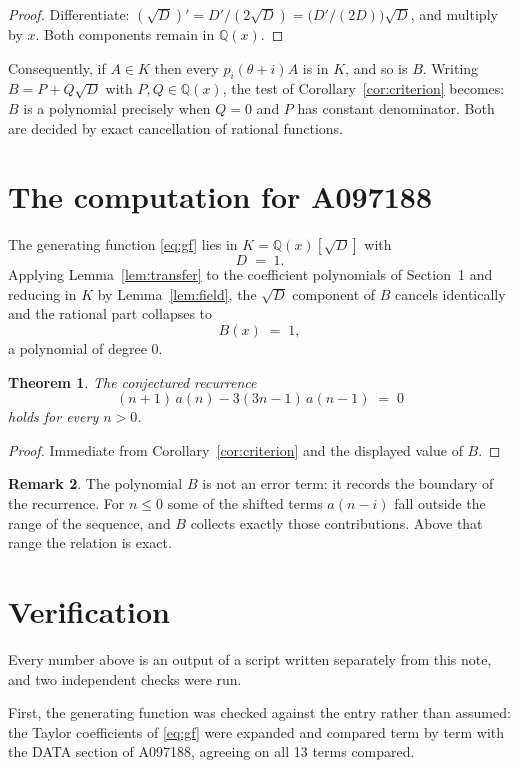 \documentclass[11pt,a4paper]{article}
\theoremstyle{plain}
\newtheorem{theorem}{Theorem}
\theoremstyle{definition}
\newtheorem{remark}[theorem]{Remark}
\begin{document}
\begin{proof}
Differentiate: $(\sqrt{D})'=D'/(2\sqrt{D})=\bigl(D'/(2D)\bigr)\sqrt{D}$, and multiply by
$x$. Both components remain in $\mathbb{Q}(x)$.
\end{proof}

Consequently, if $A\in K$ then every $p_{i}(\theta+i)A$ is in $K$, and so is $B$. Writing
$B=P+Q\sqrt{D}$ with $P,Q\in\mathbb{Q}(x)$, the test of Corollary~\ref{cor:criterion}
becomes: $B$ is a polynomial precisely when $Q=0$ and $P$ has constant denominator. Both
are decided by exact cancellation of rational functions.

\section{The computation for A097188}

The generating function \eqref{eq:gf} lies in $K=\mathbb{Q}(x)[\sqrt{D}]$ with
\[
D \;=\; 1 .
\]
Applying Lemma~\ref{lem:transfer} to the coefficient polynomials of Section~1 and reducing
in $K$ by Lemma~\ref{lem:field}, the $\sqrt{D}$ component of $B$ cancels identically and
the rational part collapses to
\[
B(x)\;=\;1 ,
\]
a polynomial of degree $0$.

\begin{theorem}
The conjectured recurrence
\[
(n + 1)\,a(n) -  3 \left(3 n - 1\right)\,a(n-1) \;=\;0
\]
holds for every $n>0$.
\end{theorem}

\begin{proof}
Immediate from Corollary~\ref{cor:criterion} and the displayed value of $B$.
\end{proof}

\begin{remark}
The polynomial $B$ is not an error term: it records the boundary of the recurrence. For
$n\le0$ some of the shifted terms $a(n-i)$ fall outside the range of the sequence,
and $B$ collects exactly those contributions. Above that range the relation is exact.
\end{remark}

\section{Verification}

Every number above is an output of a script written separately from this note, and two
independent checks were run.

First, the generating function was checked against the entry rather than assumed: the
Taylor coefficients of \eqref{eq:gf} were expanded and compared term by term with the DATA
section of A097188, agreeing on all 13 terms compared.
\end{document}
